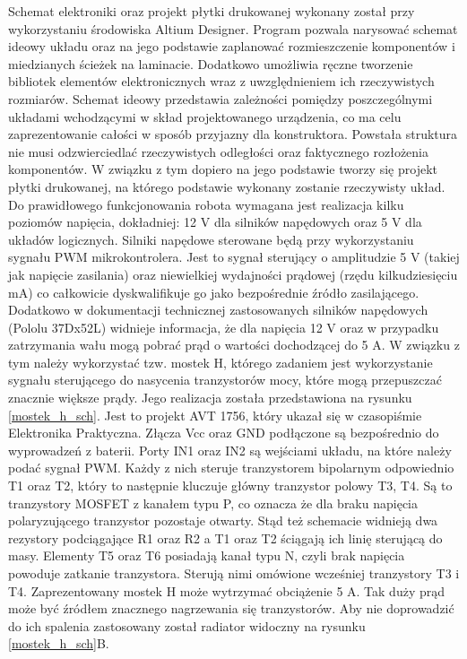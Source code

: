 Schemat elektroniki oraz projekt płytki drukowanej wykonany został przy wykorzystaniu środowiska Altium Designer. Program pozwala narysować schemat ideowy układu oraz na jego podstawie zaplanować rozmieszczenie komponentów i miedzianych ścieżek na laminacie. Dodatkowo umożliwia ręczne tworzenie bibliotek elementów elektronicznych wraz z uwzględnieniem ich rzeczywistych rozmiarów. Schemat ideowy przedstawia zależności pomiędzy poszczególnymi układami wchodzącymi w skład projektowanego urządzenia, co ma celu zaprezentowanie całości w sposób przyjazny dla konstruktora. Powstała struktura nie musi odzwierciedlać rzeczywistych odległości oraz faktycznego rozłożenia komponentów. W związku z tym dopiero na jego podstawie tworzy się projekt płytki drukowanej, na którego podstawie wykonany zostanie rzeczywisty układ.
Do prawidłowego funkcjonowania robota wymagana jest realizacja kilku poziomów napięcia, dokładniej: 12 V dla silników napędowych oraz 5 V dla układów logicznych. Silniki napędowe sterowane będą przy wykorzystaniu sygnału PWM mikrokontrolera. Jest to sygnał sterujący o amplitudzie 5 V (takiej jak napięcie zasilania) oraz  niewielkiej wydajności prądowej (rzędu kilkudziesięciu mA) co całkowicie dyskwalifikuje go jako bezpośrednie źródło zasilającego. Dodatkowo w dokumentacji technicznej zastosowanych silników napędowych (Pololu 37Dx52L) widnieje informacja, że dla napięcia 12 V oraz w przypadku zatrzymania wału mogą pobrać prąd o wartości dochodzącej do 5 A. W związku z tym należy wykorzystać tzw. mostek H, którego zadaniem jest wykorzystanie sygnału sterującego do nasycenia tranzystorów mocy, które mogą przepuszczać znacznie większe prądy. Jego realizacja została przedstawiona na rysunku \ref{mostek_h_sch}. Jest to projekt AVT 1756, który ukazał się w czasopiśmie Elektronika Praktyczna. Złącza Vcc oraz GND podłączone są bezpośrednio do wyprowadzeń z baterii. Porty IN1 oraz IN2 są wejściami układu, na które należy podać sygnał PWM. Każdy z nich steruje tranzystorem bipolarnym odpowiednio T1 oraz T2, który to następnie kluczuje główny tranzystor polowy T3, T4. Są to tranzystory MOSFET z kanałem typu P, co oznacza że dla braku napięcia polaryzującego tranzystor pozostaje otwarty. Stąd też schemacie widnieją dwa rezystory podciągające R1 oraz R2 a T1 oraz T2 ściągają ich linię sterującą do masy. Elementy T5 oraz T6 posiadają kanał typu N, czyli brak napięcia powoduje zatkanie tranzystora. Sterują nimi omówione wcześniej tranzystory T3 i T4. Zaprezentowany mostek H może wytrzymać obciążenie 5 A. Tak duży prąd może być źródłem znacznego nagrzewania się tranzystorów. Aby nie doprowadzić do ich spalenia zastosowany został radiator widoczny na rysunku \ref{mostek_h_sch}B.
